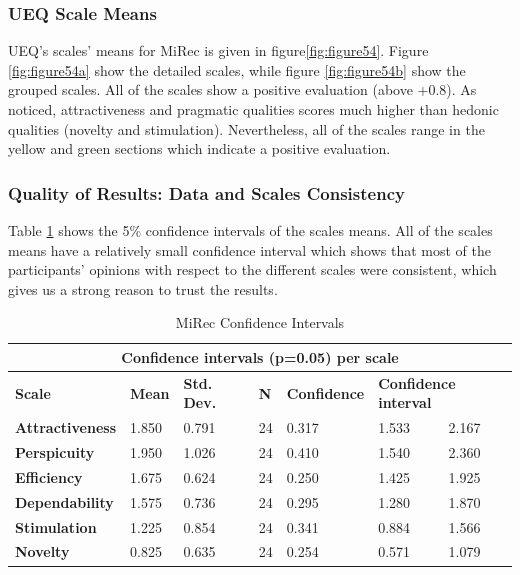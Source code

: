 \subsubsection{UEQ Scale Means}
UEQ's scales' means for MiRec is given in figure\ref{fig:figure54}. Figure
\ref{fig:figure54a} show the detailed scales, while figure \ref{fig:figure54b}
show the grouped scales. All of the scales show a positive evaluation (above
+0.8). As noticed, attractiveness and pragmatic qualities scores much higher
than hedonic qualities (novelty and stimulation). Nevertheless, all of the scales range in
the yellow and green sections which indicate a positive evaluation.
\subsubsection{Quality of Results: Data and Scales Consistency}
Table \ref{table:table55} shows the 5\% confidence intervals of
the scales means. All of the scales means have a relatively small confidence
interval which shows that most of the participants' opinions with respect to
the different scales were consistent, which gives us a strong reason to trust
the results.
\begin{table}[!htbp]
\tiny 
\centering
\begin{tabular}{|l|l|l|l|l|l|l|}
\hline
\multicolumn{7}{|c|}{\textbf{Confidence intervals (p=0.05) per scale}}                                                                              \\ \hline
\textbf{Scale}          & \textbf{Mean} & \textbf{Std. Dev.} & \textbf{N} & \textbf{Confidence} & \multicolumn{2}{l|}{\textbf{Confidence interval}} \\ \hline
\textbf{Attractiveness} & 1.850         & 0.791              & 24         & 0.317               & 1.533                   & 2.167                   \\ \hline
\textbf{Perspicuity}    & 1.950         & 1.026              & 24         & 0.410               & 1.540                   & 2.360                   \\ \hline
\textbf{Efficiency}     & 1.675         & 0.624              & 24         & 0.250               & 1.425                   & 1.925                   \\ \hline
\textbf{Dependability}  & 1.575         & 0.736              & 24         & 0.295               & 1.280                   & 1.870                   \\ \hline
\textbf{Stimulation}    & 1.225         & 0.854              & 24         & 0.341               & 0.884                   & 1.566                   \\ \hline
\textbf{Novelty}        & 0.825         & 0.635              & 24         & 0.254               & 0.571                   & 1.079                   \\ \hline
\end{tabular}
\caption{MiRec Confidence Intervals}
\label{table:table55}
\end{table}
